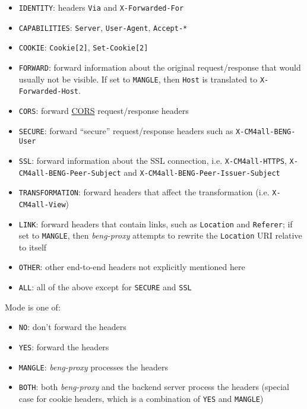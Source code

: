 \documentclass[a4paper,12pt]{article}
\begin{document}
\begin{itemize}
\item \texttt{IDENTITY}: headers \texttt{Via} and
  \texttt{X-Forwarded-For}
\item \texttt{CAPABILITIES}: \texttt{Server}, \texttt{User-Agent},
  \texttt{Accept-*}
\item \texttt{COOKIE}: \texttt{Cookie[2]}, \texttt{Set-Cookie[2]}

\item \texttt{FORWARD}: forward information about the original
  request/response that would usually not be visible.  If set to
  \verb|MANGLE|, then \texttt{Host} is translated to
  \texttt{X-Forwarded-Host}.

\item \texttt{CORS}: forward
  \href{http://www.w3.org/TR/cors/#syntax}{CORS} request/response
  headers

\item \texttt{SECURE}: forward ``secure'' request/response headers
  such as \texttt{X-CM4all-BENG-User}

\item \texttt{SSL}: forward information about the SSL connection,
  i.e. \verb|X-CM4all-HTTPS|, \verb|X-CM4all-BENG-Peer-Subject| and
  \verb|X-CM4all-BENG-Peer-Issuer-Subject|

\item \texttt{TRANSFORMATION}: forward headers that affect the
  transformation (i.e. \texttt{X-CM4all-View})

\item \texttt{LINK}: forward headers that contain links, such as
  \texttt{Location} and \texttt{Referer}; if set to \verb|MANGLE|,
  then \emph{beng-proxy} attempts to rewrite the \texttt{Location} URI
  relative to itself

\item \texttt{OTHER}: other end-to-end headers not explicitly
  mentioned here

\item \texttt{ALL}: all of the above except for \texttt{SECURE} and
  \texttt{SSL}

\end{itemize}

Mode is one of:

\begin{itemize}
\item \texttt{NO}: don't forward the headers
\item \texttt{YES}: forward the headers
\item \texttt{MANGLE}: \emph{beng-proxy} processes the headers
\item \texttt{BOTH}: both \emph{beng-proxy} and the backend server
  process the headers (special case for cookie headers, which is a
  combination of \texttt{YES} and \texttt{MANGLE})
\end{itemize}
\end{document}
